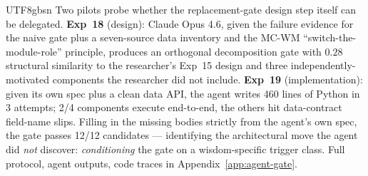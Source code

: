 \documentclass{article}
\begin{document}
\begin{CJK*}{UTF8}{gbsn}
Two pilots probe whether the replacement-gate design step itself can
be delegated. \textbf{Exp~18} (design): Claude Opus 4.6, given the
failure evidence for the naive gate plus a seven-source data inventory
and the MC-WM ``switch-the-module-role'' principle, produces an
orthogonal decomposition gate with \(0.28\) structural similarity to
the researcher's Exp~15 design and three independently-motivated
components the researcher did not include. \textbf{Exp~19}
(implementation): given its own spec plus a clean data API, the agent
writes 460 lines of Python in 3 attempts; 2/4 components execute
end-to-end, the others hit data-contract field-name slips. Filling in
the missing bodies strictly from the agent's own spec, the gate
passes 12/12 candidates — identifying the architectural move the
agent did \emph{not} discover: \emph{conditioning} the gate on a
wisdom-specific trigger class. Full protocol, agent outputs, code
traces in Appendix~\ref{app:agent-gate}.


\end{CJK*}
\end{document}
